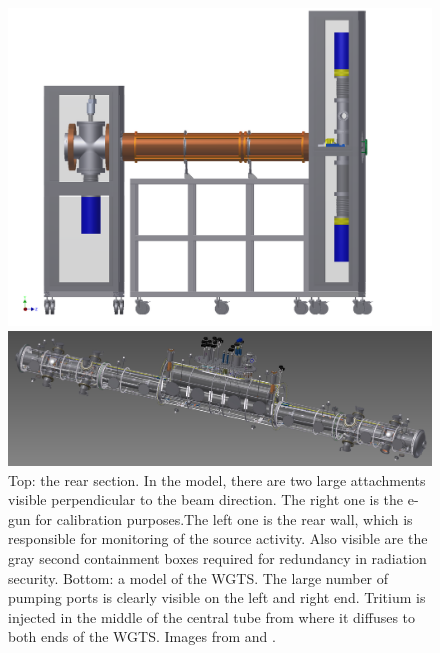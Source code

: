      \begin{figure}
     \centering
		\begin{minipage}{0.6\textwidth}
				\includegraphics[width = 1.0\textwidth]{graphics/katrinExperiment/rearSectionFull1.png}
		\end{minipage}
		\begin{minipage}{\textwidth}
			\includegraphics[width = 1.0\textwidth]{graphics/katrinExperiment/WGTS.jpg}
		\end{minipage}
		\caption[Rear Section and WGTS]{Top: the rear section. In the model, there are two large attachments visible perpendicular to the beam direction. The right one is the e-gun for calibration purposes.The left one is the rear wall, which is responsible for monitoring of the source activity. Also visible are the gray second containment boxes required for redundancy in radiation security. Bottom: a model of the WGTS. The large number of pumping ports is clearly visible on the left and right end. Tritium is injected in the middle of the central tube from where it diffuses to both ends of the WGTS. Images from \cite{rearSection} and \cite{WGTSDrexlin}.}
		\label{fig:sourceSide}
      \end{figure}
      

